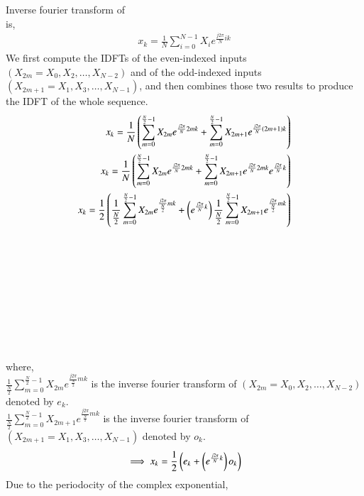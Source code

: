 \documentclass[journal,12pt,twocolumn]{IEEEtran}
\begin{document}
Inverse fourier transform of 
\\
 is,
\begin{align}
     x_{k} = \frac{1}{N} \sum _{i=0}^{N-1}X_{i}e^{\frac{j2\pi}{N}ik}
\end{align}
We first compute the IDFTs of the even-indexed inputs  $(X_{2m}=X_{0},X_{2},\ldots ,X_{N-2})$ and of the odd-indexed inputs $(X_{2m+1}=X_{1},X_{3},\ldots ,X_{N-1})$, and then combines those two results to produce the IDFT of the whole sequence.
\begin{align}
     x_{k} = \frac{1}{N} \left(\sum _{m=0}^{\frac{N}{2}-1}X_{2m}e^{\frac{j2\pi}{N}2mk} + \sum _{m=0}^{\frac{N}{2}-1}X_{2m+1}e^{\frac{j2\pi}{N}(2m+1)k}\right)
     \\
     x_{k} = \frac{1}{N} \left(\sum _{m=0}^{\frac{N}{2}-1}X_{2m}e^{\frac{j2\pi}{N}2mk} + \sum _{m=0}^{\frac{N}{2}-1}X_{2m+1}e^{\frac{j2\pi}{N}2mk} e^{\frac{j2\pi}{N}k}\right)
     \\
     x_{k} =\frac{1}{2} \left( \frac{1}{\frac{N}{2}}\sum _{m=0}^{\frac{N}{2}-1}X_{2m}e^{\frac{j2\pi}{\frac{N}{2}}mk} + \left( e^{\frac{j2\pi}{N}k}\right)\frac{1}{\frac{N}{2}}\sum _{m=0}^{\frac{N}{2}-1}X_{2m+1}e^{\frac{j2\pi}{\frac{N}{2}}mk}\right)
\end{align}
\\
\\
\\
\\
\\
\\
\\
\\
\\
where,
\\
$\frac{1}{\frac{N}{2}}\sum _{m=0}^{\frac{N}{2}-1}X_{2m}e^{\frac{j2\pi}{\frac{N}{2}}mk}$ is the inverse fourier transform of $(X_{2m}=X_{0},X_{2},\ldots ,X_{N-2})$ denoted by $e_{k}$.
\\
$\frac{1}{\frac{N}{2}}\sum _{m=0}^{\frac{N}{2}-1}X_{2m+1}e^{\frac{j2\pi}{\frac{N}{2}}mk}$ is the inverse fourier transform of $(X_{2m+1}=X_{1},X_{3},\ldots ,X_{N-1})$ denoted by $o_{k}$.
\begin{align}
\implies x_{k} =\frac{1}{2} \left(  e_{k} + \left( e^{\frac{j2\pi}{N}k}\right)o_{k}\right)
\end{align}
Due to the periodocity of the complex exponential,
\\
\end{document}
